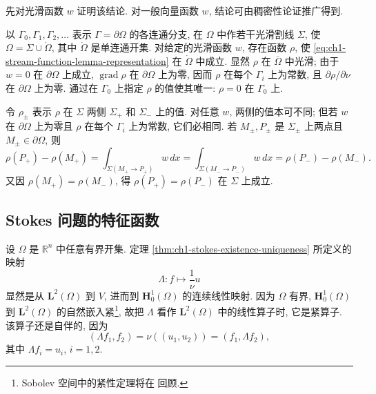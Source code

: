 \begin{Proof}
先对光滑函数 $w$ 证明该结论. 对一般向量函数 $w$, 结论可由稠密性论证推广得到.

以 $\Gamma_0,\Gamma_1,\Gamma_2,\ldots$ 表示 $\Gamma=\partial\Omega$ 的各连通分支, 在 $\Omega$ 中作若干光滑割线 $\Sigma$, 使 $\Omega=\Sigma\cup\dot\Omega$, 其中 $\dot\Omega$ 是单连通开集. 对给定的光滑函数 $w$, 存在函数 $\rho$, 使 \eqref{eq:ch1-stream-function-lemma-representation} 在 $\dot\Omega$ 中成立. 显然 $\rho$ 在 $\overline\Omega$ 中光滑; 由于 $w=0$ 在 $\partial\Omega$ 上成立, $\operatorname{grad}\rho$ 在 $\partial\Omega$ 上为零, 因而 $\rho$ 在每个 $\Gamma_i$ 上为常数, 且 $\partial\rho/\partial\nu$ 在 $\partial\Omega$ 上为零. 通过在 $\Gamma_0$ 上指定 $\rho$ 的值使其唯一: $\rho=0$ 在 $\Gamma_0$ 上.

令 $\rho_\pm$ 表示 $\rho$ 在 $\Sigma$ 两侧 $\Sigma_+$ 和 $\Sigma_-$ 上的值. 对任意 $w$, 两侧的值本可不同; 但若 $w$ 在 $\partial\Omega$ 上为零且 $\rho$ 在每个 $\Gamma_i$ 上为常数, 它们必相同. 若 $M_\pm,P_\pm$ 是 $\Sigma_\pm$ 上两点且 $M_\pm\in\partial\Omega$, 则
\[
\rho(P_+)-\rho(M_+)
=\int_{\Sigma(M_+\to P_+)}w\,dx
=\int_{\Sigma(M_-\to P_-)}w\,dx
=\rho(P_-)-\rho(M_-).
\]
又因 $\rho(M_+)=\rho(M_-)$, 得 $\rho(P_+)=\rho(P_-)$ 在 $\Sigma$ 上成立.
\end{Proof}

\subsection{Stokes 问题的特征函数}
\label{subsec:ch1-stokes-eigenfunctions}

设 $\Omega$ 是 $\mathbb R^n$ 中任意有界开集. 定理 \ref{thm:ch1-stokes-existence-uniqueness} 所定义的映射
\[
\Lambda:f\longmapsto\frac1\nu u
\]
显然是从 $\mathbf L^2(\Omega)$ 到 $V$, 进而到 $\mathbf H_0^1(\Omega)$ 的连续线性映射. 因为 $\Omega$ 有界, $\mathbf H_0^1(\Omega)$ 到 $\mathbf L^2(\Omega)$ 的自然嵌入紧\setcounter{footnote}{0}\footnote{Sobolev 空间中的紧性定理将在  回顾.}, 故把 $\Lambda$ 看作 $\mathbf L^2(\Omega)$ 中的线性算子时, 它是紧算子. 该算子还是自伴的, 因为
\[
(\Lambda f_1,f_2)=\nu((u_1,u_2))=(f_1,\Lambda f_2),
\]
其中 $\Lambda f_i=u_i$, $i=1,2$.

